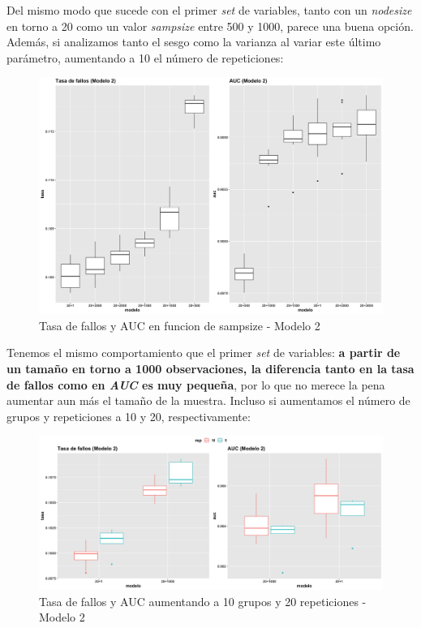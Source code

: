 \documentclass[
]{article}
\begin{document}
Del mismo modo que sucede con el primer \emph{set} de variables, tanto
con un \emph{nodesize} en torno a 20 como un valor \emph{sampsize} entre
500 y 1000, parece una buena opción. Además, si analizamos tanto el
sesgo como la varianza al variar este último parámetro, aumentando a 10
el número de repeticiones:

\begin{figure}[h!]

{\centering \includegraphics[width=0.99\linewidth,height=0.99\textheight,]{./charts/random_forest/04_comp_tasa_auc_modelo2_sampsizes} 

}

\caption{Tasa de fallos y AUC en funcion de  sampsize - Modelo 2}\label{fig:unnamed-chunk-97}
\end{figure}

Tenemos el mismo comportamiento que el primer \emph{set} de variables:
\textbf{a partir de un tamaño en torno a 1000 observaciones, la
diferencia tanto en la tasa de fallos como en \emph{AUC} es muy
pequeña}, por lo que no merece la pena aumentar aun más el tamaño de la
muestra. Incluso si aumentamos el número de grupos y repeticiones a 10 y
20, respectivamente:

\begin{figure}[h!]

{\centering \includegraphics[width=0.99\linewidth,height=0.99\textheight,]{./charts/random_forest/04_comp_tasa_auc_modelo2_sampsizes2_10_folds} 

}

\caption{Tasa de fallos y AUC aumentando a 10 grupos y 20 repeticiones - Modelo 2}\label{fig:unnamed-chunk-98}
\end{figure}
\end{document}
